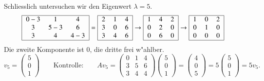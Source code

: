 Schliesslich untersuchen wir den Eigenwert $\lambda=5$.
\begin{align*}
\begin{tabular}{|>{$}c<{$}>{$}c<{$}>{$}c<{$}|}
\hline
0-3&1&4\\
3&5-3&6\\
3&4&4-3\\
\hline
\end{tabular}
&=
\begin{tabular}{|>{$}c<{$}>{$}c<{$}>{$}c<{$}|}
\hline
2&1&4\\
3&0&6\\
3&4&6\\
\hline
\end{tabular}
\rightarrow
\begin{tabular}{|>{$}c<{$}>{$}c<{$}>{$}c<{$}|}
\hline
1&4&2\\
0&2&0\\
0&6&0\\
\hline
\end{tabular}
\rightarrow
\begin{tabular}{|>{$}c<{$}>{$}c<{$}>{$}c<{$}|}
\hline
1&0&2\\
0&1&0\\
0&0&0\\
\hline
\end{tabular}
\end{align*}
Die zweite Komponente ist $0$, die dritte frei w"ahlber.
\[
v_5
=
\begin{pmatrix}5\\0\\1\end{pmatrix}
\qquad\text{Kontrolle:}\qquad
Av_5
=
\begin{pmatrix}
0&1&4\\
3&5&6\\
3&4&4
\end{pmatrix}
\begin{pmatrix}5\\0\\1\end{pmatrix}
=
\begin{pmatrix}4\\0\\5\end{pmatrix}
=
5\begin{pmatrix}5\\0\\1\end{pmatrix}
=
5v_5.
\]









